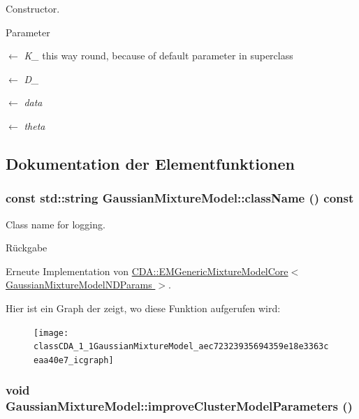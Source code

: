 Constructor. 


\begin{DoxyParams}{Parameter}
\item[\mbox{$\leftarrow$} {\em K\_\-}]this way round, because of default parameter in superclass \item[\mbox{$\leftarrow$} {\em D\_\-}]\item[\mbox{$\leftarrow$} {\em data}]\item[\mbox{$\leftarrow$} {\em theta}]\end{DoxyParams}


\subsection{Dokumentation der Elementfunktionen}
\hypertarget{classCDA_1_1GaussianMixtureModel_aec72323935694359e18e3363ceaa40e7}{
\subsubsection[{className}]{\setlength{\rightskip}{0pt plus 5cm}const std::string GaussianMixtureModel::className () const}}
\label{classCDA_1_1GaussianMixtureModel_aec72323935694359e18e3363ceaa40e7}


Class name for logging. 

\begin{DoxyReturn}{Rückgabe}

\end{DoxyReturn}


Erneute Implementation von \hyperlink{classCDA_1_1EMGenericMixtureModelCore_a6e444765b04615888d41c4ab6c82ae61}{CDA::EMGenericMixtureModelCore$<$ GaussianMixtureModelNDParams $>$}.



Hier ist ein Graph der zeigt, wo diese Funktion aufgerufen wird:\nopagebreak
\begin{figure}[H]
\begin{center}
\leavevmode
\texttt{[image: classCDA\_1\_1GaussianMixtureModel\_aec72323935694359e18e3363ceaa40e7\_icgraph]}
\end{center}
\end{figure}


\hypertarget{classCDA_1_1GaussianMixtureModel_afe0080d43eb7169d66e57d074f1b7efc}{
\subsubsection[{improveClusterModelParameters}]{\setlength{\rightskip}{0pt plus 5cm}void GaussianMixtureModel::improveClusterModelParameters ()}}
\label{classCDA_1_1GaussianMixtureModel_afe0080d43eb7169d66e57d074f1b7efc}


